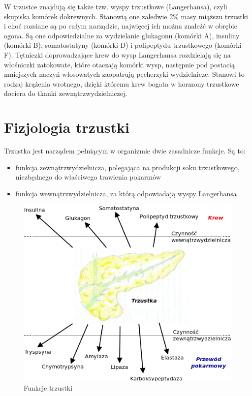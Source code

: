 \documentclass[a4paper, 12pt]{report}
\begin{document}
W trzustce znajdują się także tzw. wyspy trzustkowe (Langerhansa),
czyli skupiska komórek dokrewnych. Stanowią one zaledwie 2\% masy
miąższu trzustki i choć rozsiane są po całym narządzie, najwięcej
ich można znaleźć w obrębie ogona. Są one odpowiedzialne za
wydzielanie glukagonu (komórki A), insuliny (komórki B), somatostatyny
(komórki D) i polipeptydu trzustkowego (komórki F). Tętniczki
doprowadzające krew do wysp Langerhansa rozdzielają się na włośniczki
zatokowate, które otaczają komórki wysp, następnie pod postacią
mniejszych naczyń włosowatych zaopatrują pęcherzyki wydzielnicze. 
Stanowi to rodzaj krążenia wrotnego, dzięki któremu krew bogata w
hormony trzustkowe dociera do tkanki
zewnątrzwydzielniczej.\cite{szczeklik}\cite{traczyk}

\chapter{Fizjologia trzustki}

Trzustka jest narządem pełniącym w organizmie dwie zasadnicze
funkcje. Są to:

\begin{itemize}
\setlength{\itemsep}{0cm}
\setlength{\parskip}{0cm}
\item funkcja zewnątrzwydzielnicza, polegająca na produkcji soku
  trzustkowego, niezbędnego do właściwego trawienia pokarmów
\item funkcja wewnątrzwydzielnicza, za którą odpowiadają wyspy
  Langerhansa
\end{itemize}

\begin{figure}[!h]
\centering
\includegraphics[scale=0.35]{pan-fun1}
\caption{Funkcje trzustki}
\end{figure}
\end{document}
